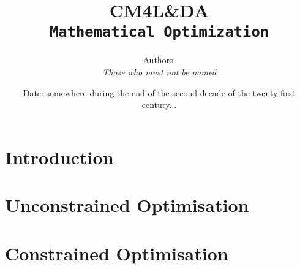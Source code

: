 \documentclass[oneside]{book}
\title{
    \textbf{CM4L\&DA}\\
    \texttt{Mathematical Optimization}
}
\author{Authors:\\ \textit{Those who must not be named}}
\date{Date: somewhere during the end of the second decade of the twenty-first century...}
\begin{document}
\maketitle

\tableofcontents

\chapter{Introduction}


\chapter{Unconstrained Optimisation}


\chapter{Constrained Optimisation}

\end{document}

